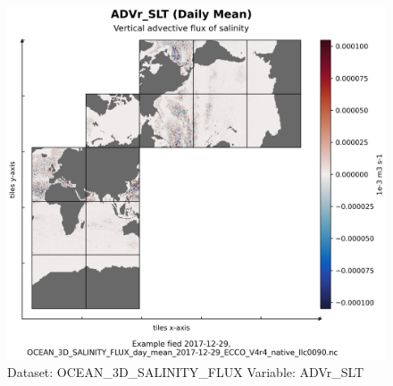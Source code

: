 \begin{figure}[H]
\centering
\includegraphics[scale=0.55]{../images/plots/native_plots/Ocean_Three-Dimensional_Salinity_Fluxes/ADVr_SLT.png}
\caption{Dataset: OCEAN\_3D\_SALINITY\_FLUX Variable: ADVr\_SLT}
\label{tab:table-OCEAN_3D_SALINITY_FLUX_ADVr_SLT-Plot}
\end{figure}
\pagebreak
